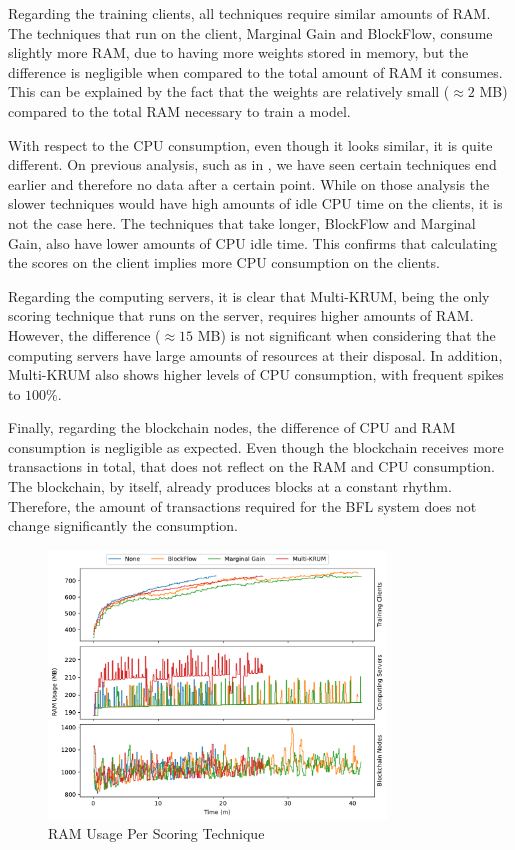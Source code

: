 Regarding the training clients, all techniques require similar amounts of RAM. The techniques that run on the client, Marginal Gain and BlockFlow, consume slightly more RAM, due to having more weights stored in memory, but the difference is negligible when compared to the total amount of RAM it consumes. This can be explained by the fact that the weights are relatively small ($\approx 2$ MB) compared to the total RAM necessary to train a model.

With respect to the CPU consumption, even though it looks similar, it is quite different. On previous analysis, such as in , we have seen certain techniques end earlier and therefore no data after a certain point. While on those analysis the slower techniques would have high amounts of idle CPU time on the clients, it is not the case here. The techniques that take longer, BlockFlow and Marginal Gain, also have lower amounts of CPU idle time. This confirms that calculating the scores on the client implies more CPU consumption on the clients.

Regarding the computing servers, it is clear that Multi-KRUM, being the only scoring technique that runs on the server, requires higher amounts of RAM. However, the difference ($\approx 15$ MB) is not significant when considering that the computing servers have large amounts of resources at their disposal. In addition, Multi-KRUM also shows higher levels of CPU consumption, with frequent spikes to $100\%$.

Finally, regarding the blockchain nodes, the difference of CPU and RAM consumption is negligible as expected. Even though the blockchain receives more transactions in total, that does not reflect on the RAM and CPU consumption. The blockchain, by itself, already produces blocks at a constant rhythm. Therefore, the amount of transactions required for the BFL system does not change significantly the consumption.

\begin{figure}[!hpt]
    \centering
    \centering
    \includegraphics[width=0.8\textwidth]{graphics/scoring/ram.pdf}
    \caption{RAM Usage Per Scoring Technique}
    \label{fig:ram_scoring}
\end{figure}

